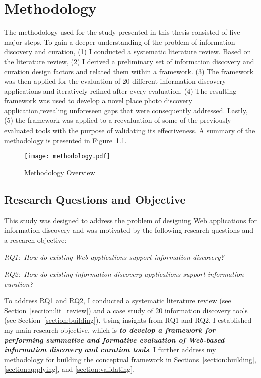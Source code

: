 \chapter{Methodology}
\label{chapter:methodology}

The methodology used for the study presented in this thesis consisted of five major steps. To gain a deeper understanding of the problem of information discovery and curation, (1) I conducted a systematic literature review. Based on the literature review, (2) I derived a preliminary set of information discovery and curation design factors and related them within a framework. (3) The framework was then applied for the evaluation of 20 different information discovery applications and iteratively refined after every evaluation. (4) The resulting framework was used to develop a novel place photo discovery application,revealing unforeseen gaps that were consequently addressed. Lastly, (5) the framework was applied to a reevaluation of some of the previously evaluated tools with the purpose of validating its effectiveness.  A summary of the methodology is presented in Figure~\ref{fig:methodology}.
\begin{figure}[ht!]
	\noindent
	\centering
    \texttt{[image: methodology.pdf]}
	\caption{Methodology Overview}
	\label{fig:methodology} 
\end{figure}

{\section{Research Questions and Objective}
This study was designed to address the problem of designing Web applications for information discovery and was motivated by the following research questions and a research objective:

\emph{RQ1:~How do existing Web applications support information discovery?}

\emph{RQ2:~How do existing information discovery applications support information curation?}

\pagebreak 

To address RQ1 and RQ2, I conducted a systematic literature review (see Section~\ref{section:lit_review}) and a case study of 20 information discovery tools (see Section~\ref{section:building}). Using insights from RQ1 and RQ2, I established my main research objective, which is \emph{\textbf{to develop a framework for performing summative and formative evaluation of Web-based information discovery and curation tools}}. I further address my methodology for building the conceptual framework in Sections~\ref{section:building}, \ref{section:applying}, and \ref{section:validating}.

}%

